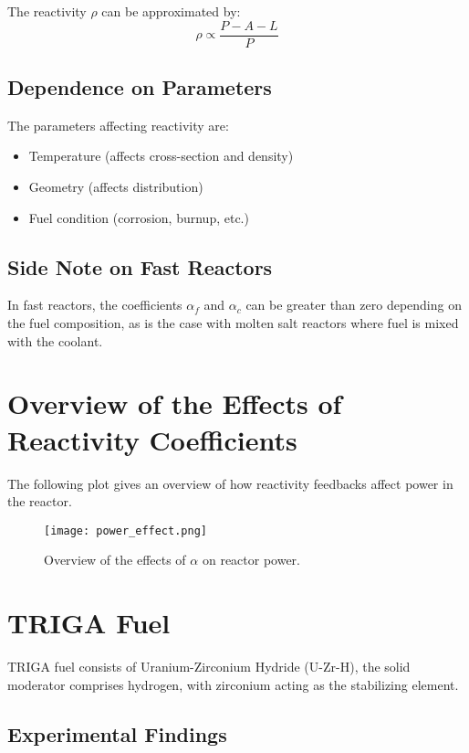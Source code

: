 The reactivity $\rho$ can be approximated by:
\begin{equation}
    \rho \propto \frac{P - A - L}{P}
\end{equation}

\subsection{Dependence on Parameters}

The parameters affecting reactivity are:
\begin{itemize}
    \item Temperature (affects cross-section and density)
    \item Geometry (affects distribution)
    \item Fuel condition (corrosion, burnup, etc.)
\end{itemize}

\subsection{Side Note on Fast Reactors}

In fast reactors, the coefficients $\alpha_f$ and $\alpha_c$ can be greater than zero depending on the fuel composition, as is the case with molten salt reactors where fuel is mixed with the coolant.

\section{Overview of the Effects of Reactivity Coefficients}

The following plot gives an overview of how reactivity feedbacks affect power in the reactor.
\begin{figure}[H]
    \centering
        \texttt{[image: power\_effect.png]}
    \caption{Overview of the effects of $\alpha$ on reactor power.}
\end{figure}

\section{TRIGA Fuel}

TRIGA fuel consists of Uranium-Zirconium Hydride (U-Zr-H), the solid moderator comprises hydrogen, with zirconium acting as the stabilizing element.

\subsection{Experimental Findings}

